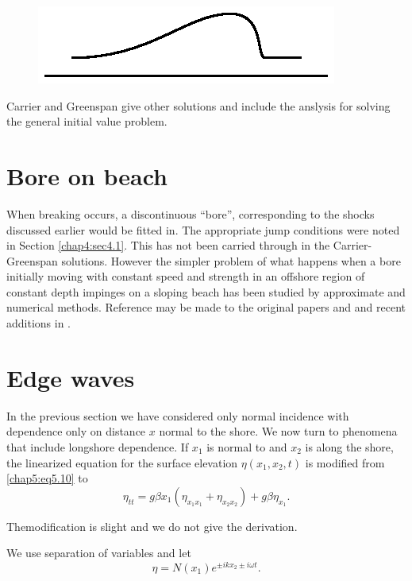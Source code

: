 \begin{figure}[H]
\centering
\includegraphics{figures/fig61-5.4.eps}
\caption{}
\label{chap1:fig5.4}
\end{figure}\pageoriginale

Carrier and Greenspan \cite{key4} give other solutions and include the anslysis for solving the general initial value problem.

\section{Bore on beach}\label{chap5:sec5.5}

When breaking occurs, a discontinuous ``bore'', corresponding to the shocks discussed earlier would be fitted in. The appropriate jump conditions were noted in Section \ref{chap4:sec4.1}. This has not been carried through in the Carrier-Greenspan solutions. However the simpler problem of what happens when a bore initially moving with constant speed and strength in an offshore region of constant depth impinges on a sloping beach has been studied by approximate and numerical methods. Reference may be made to the original papers \cite{key7} and \cite{key8} and recent additions in \cite{key9}.

\section{Edge waves}\label{chap5:sec5.6}

In the previous section we have considered only normal incidence with dependence only on distance $x$ normal to the shore. We now turn to phenomena that include longshore dependence. If $x_1$ is normal to and $x_2$ is along the shore, the linearized equation for the surface elevation $\eta(x_1,x_2,t)$ is modified from \eqref{chap5:eq5.10} to 
\begin{equation}
\eta_{tt}=g\beta x_1\left(\eta_{x_1 x_1}+\eta_{x_2 x_2}\right)+g\beta \eta_{x_1}. \tag{5.44}\label{chap5:eq5.44}
\end{equation}

The\pageoriginale modification is slight and we do not give the derivation.

We use separation of variables and let
\begin{equation}
\eta=N(x_1)e^{\pm ikx_2\pm i\omega t}.\tag{5.45}\label{chap5:eq5.45}
\end{equation}

